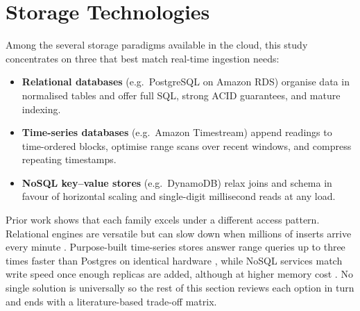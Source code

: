\documentclass[nomenclature, english, biblatex]{kththesis}
\numberwithin{listing}{chapter}
\begin{document}




%

\section{Storage Technologies}
\label{sec:storage}

Among the several storage paradigms available in the cloud, this study concentrates on three that best match real-time ingestion needs:

\begin{itemize}[leftmargin=*]
 \item \textbf{Relational databases} (e.g.\ PostgreSQL on Amazon RDS) organise data in normalised tables and offer full SQL, strong \gls{ACID} guarantees, and mature indexing. 
 \item \textbf{Time-series databases} (e.g.\ Amazon Timestream) append readings to time-ordered blocks, optimise range scans over recent windows, and compress repeating timestamps. 
 \item \textbf{NoSQL key–value stores} (e.g.\ DynamoDB) relax joins and schema in favour of horizontal scaling and single-digit millisecond reads at any load. 
\end{itemize}

\noindent
Prior work shows that each family excels under a different access pattern. Relational engines are versatile but can slow down when millions of inserts arrive every minute \cite{Heldt2021SciTS}. Purpose-built time-series stores answer range queries up to three times faster than Postgres on identical hardware \cite{Grzesik2020EdgeIoTBenchmark}, while NoSQL services match write speed once enough replicas are added, although at higher memory cost \cite{Vergara2021PerformanceTSDB}. No single solution is universally  so the rest of this section reviews each option in turn and ends with a literature-based trade-off matrix.
\end{document}
